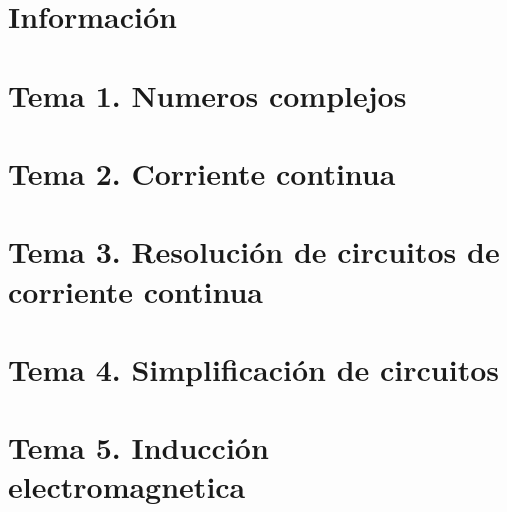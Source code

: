 \documentclass[12pt, twoside, openright]{report} %
\begin{document}




\part{Información}



\part{Tema 1. Numeros complejos}



\part{Tema 2. Corriente continua}



\part{Tema 3. Resolución de circuitos de corriente continua}




\part{Tema 4. Simplificación de circuitos}



\part{Tema 5. Inducción electromagnetica}


\end{document}
